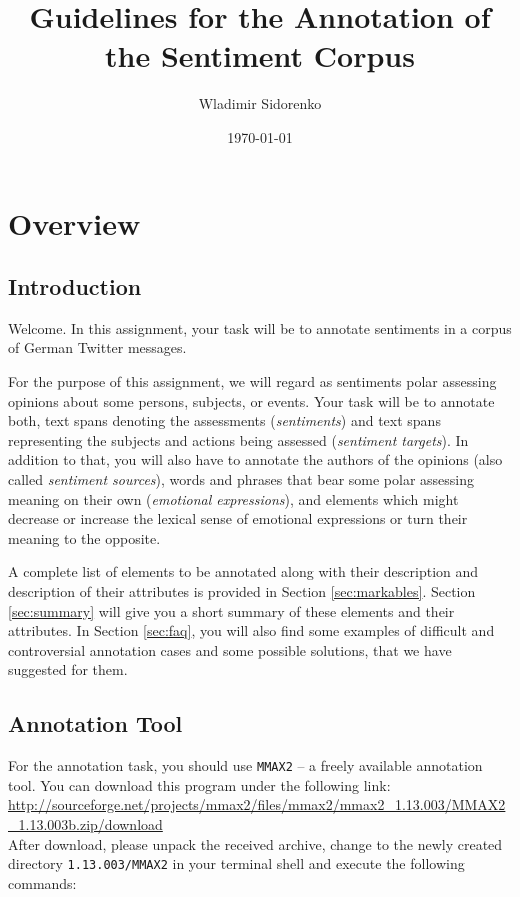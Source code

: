 \documentclass[11pt,a4paper]{article}
\author{Wladimir Sidorenko}
\date{\today}
\title{Guidelines for the Annotation of the Sentiment Corpus}
\begin{document}
\maketitle{}
\section{Overview}
\subsection{Introduction}

Welcome.  In this assignment, your task will be to annotate sentiments in a
corpus of German Twitter messages.

For the purpose of this assignment, we will regard as sentiments polar
assessing opinions about some persons, subjects, or events.  Your task will be
to annotate both, text spans denoting the assessments (\textit{sentiments})
and text spans representing the subjects and actions being assessed
(\textit{sentiment targets}).  In addition to that, you will also have to
annotate the authors of the opinions (also called \textit{sentiment sources}),
words and phrases that bear some polar assessing meaning on their own
(\textit{emotional expressions}), and elements which might decrease or
increase the lexical sense of emotional expressions or turn their meaning to
the opposite.

A complete list of elements to be annotated along with their description and
description of their attributes is provided in Section \ref{sec:markables}.
Section \ref{sec:summary} will give you a short summary of these elements
and their attributes.  In Section \ref{sec:faq}, you will also find some
examples of difficult and controversial annotation cases and some possible
solutions, that we have suggested for them.

\subsection{Annotation Tool}

For the annotation task, you should use \texttt{MMAX2} -- a freely
available annotation tool.  You can download this program under the
following link:\\\newline
{\setlength{\parindent}{0pt}\small\url{http://sourceforge.net/projects/mmax2/files/mmax2/mmax2_1.13.003/MMAX2_1.13.003b.zip/download}}\\\newline
After download, please unpack the received archive, change to the
newly created directory \texttt{1.13.003/MMAX2} in your terminal shell
and execute the following commands:\\
\end{document}
